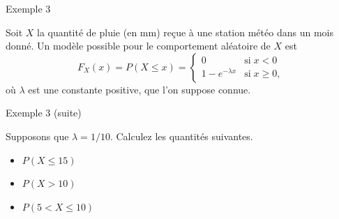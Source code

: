 \documentclass[handout]{BeamerTemplate}
\begin{document}
\begin{frame}[t]{Exemple 3}

{\small %
Soit $X$ la quantité de pluie (en mm) reçue à une station météo dans un mois donné. Un modèle possible pour le comportement aléatoire de $X$ est
 $$F_X(x)=P(X\le x)=\left\{\begin{array}{ll}
 0 & \textrm{si} \; x<0\\
 1-e^{-\lambda x} & \textrm{si} \; x\ge0,
 \end{array}\right.$$
o\`u $\lambda$ est une constante positive, que l'on suppose connue.}


\end{frame}
\begin{frame}[t]{Exemple 3 (suite)}

Supposons que $\lambda=1/10$. Calculez les quantités suivantes.

\begin{itemize}\itemsep=5mm
\item $P(X\leq 15)$
\item $P(X> 10)$
\item $P(5<X\leq 10)$
\end{itemize}

\vspace{5mm}
\end{frame}
\end{document}
